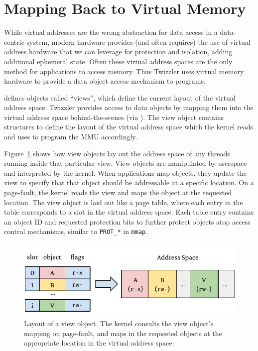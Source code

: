 \section{Mapping Back to Virtual Memory}


\label{sec:view}


While virtual addresses are the wrong abstraction
for data access in a data-centric system, modern hardware provides (and often requires) the use of virtual address
hardware that we can leverage for protection and isolation, adding additional ephemeral state. Often these virtual
address spaces are the only method for applications to access memory. Thus Twizzler uses virtual memory hardware to
provide a data object access mechanism to programs.

\Twizzler defines objects called ``views'', which define the current
layout of the virtual address space. Twizzler
provides access to data objects by mapping them into the virtual address space
behind-the-scenes (via \libcore). The view object contains structures to define the layout of the
virtual address space which the kernel reads and uses to program the MMU accordingly.

Figure~\ref{fig:view} shows how view objects lay out the address space of any threads running inside
that particular view. View objects are manipulated by userspace and interpreted by the kernel. When
applications map objects, they update the view to specify that that object should be addressable at
a specific location. On a page-fault, the kernel reads the view and maps the object at the requested
location. The view object is laid out like a page table, where each entry in the table corresponds
to a slot in the virtual address space. Each table entry contains an object ID and requested
protection bits to further protect objects atop access control mechanisms, similar to
\texttt{PROT\_*} in \texttt{mmap}.

\begin{figure}
    \centering
    \includegraphics[width=\linewidth]{fig/view}
    \caption[Layout of a view object]{Layout of a view object. The kernel consults the view object's mapping on page-fault,
        and maps in the requested objects at the appropriate location in the virtual address space.}
    \label{fig:view}
\end{figure}

